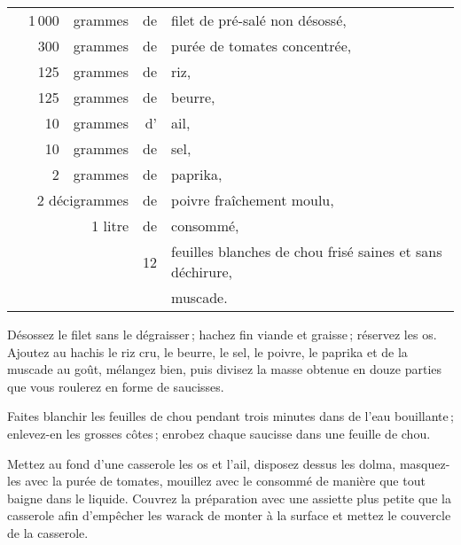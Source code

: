 \footnotesize
\begin{longtable}{rrrrp{16em}}
 & 1 000 & grammes & de & filet de pré-salé non désossé,                                                  \\
 &   300 & grammes & de & purée de tomates concentrée,                                                    \\
 &   125 & grammes & de & riz,                                                                            \\
 &   125 & grammes & de & beurre,                                                                         \\
 &    10 & grammes & d' & ail,                                                                            \\
 &    10 & grammes & de & sel,                                                                            \\
 &     2 & grammes & de & paprika,                                                                        \\
 &  \multicolumn{2}{r}{2 décigrammes} & de & poivre fraîchement moulu,                                    \\
 &       & 1 litre & de & consommé,                                                                       \\
 &       &         & 12 & feuilles blanches de chou frisé saines et sans déchirure,                       \\
 &       &         &    & muscade.                                                                        \\
\end{longtable}
\normalsize

Désossez le filet sans le dégraisser ; hachez fin viande et graisse ; réservez
les os. Ajoutez au hachis le riz cru, le beurre, le sel, le poivre, le paprika
et de la muscade au goût, mélangez bien, puis divisez la masse obtenue en douze
parties que vous roulerez en forme de saucisses.

Faites blanchir les feuilles de chou pendant trois minutes dans de l'eau
bouillante ; enlevez-en les grosses côtes ; enrobez chaque saucisse dans une
feuille de chou.

Mettez au fond d'une casserole les os et l'ail, disposez dessus les dolma,
masquez-les avec la purée de tomates, mouillez avec le consommé de manière que
tout baigne dans le liquide. Couvrez la préparation avec une assiette plus
petite que la casserole afin d'empêcher les warack de monter à la surface et
mettez le couvercle de la casserole.

